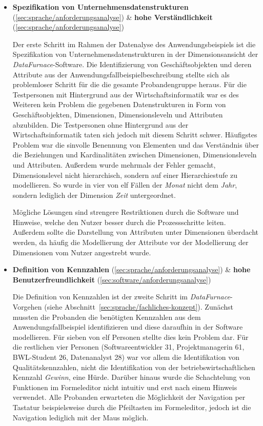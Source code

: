 \documentclass[
  language=german, %
  type=bachelor,%
  ngerman
]{isthesis}
\begin{document}
\begin{content}
\begin{itemize}
  \item \textbf{Spezifikation von Unternehmensdatenstrukturen} (\ref{sec:sprache/anforderungsanalyse}) \& \textbf{hohe Verständlichkeit} (\ref{sec:sprache/anforderungsanalyse})

    Der erste Schritt im Rahmen der Datenalyse des Anwendungsbeispiels ist
    die Spezifikation von Unternehmensdatenstrukturen in der Dimensionsansicht
    der \textit{DataFurnace}-Software. Die Identifizierung von
    Geschäftsobjekten und deren Attribute aus der
    Anwendungsfallbeispielbeschreibung stellte sich als problemloser Schritt
    für die die gesamte Probandengruppe heraus. Für die Testpersonen mit
    Hintergrund aus der Wirtschaftsinformatik war es des Weiteren kein Problem
    die gegebenen Datenstrukturen in Form von Geschäftsobjekten, Dimensionen,
    Dimensionsleveln und Attributen abzubilden. Die Testpersonen ohne
    Hintergrund aus der Wirtschaftsinformatik taten sich jedoch mit diesem
    Schritt schwer. Häufigstes Problem war die sinvolle Benennung von Elementen
    und das Verständnis über die Beziehungen und Kardinalitäten zwischen
    Dimensionen, Dimensionsleveln und Attributen. Außerdem wurde mehrmals der
    Fehler gemacht, Dimensionslevel nicht hierarchisch, sondern auf einer
    Hierarchiestufe zu modellieren. So wurde in vier von elf Fällen
    der \textit{Monat} nicht dem \textit{Jahr}, sondern lediglich der Dimension
    \textit{Zeit} untergeordnet. 
    
    Mögliche Lösungen sind strengere Restriktionen durch die
    Software und Hinweise, welche den Nutzer besser durch die Prozessschritte
    leiten. Außerdem sollte die Darstellung von Attributen unter Dimensionen
    überdacht werden, da häufig die Modellierung der Attribute vor der
    Modellierung der Dimensionen vom Nutzer angestrebt wurde.

  \item \textbf{Definition von Kennzahlen} (\ref{sec:sprache/anforderungsanalyse}) \& \textbf{hohe Benutzerfreundlichkeit} (\ref{sec:software/anforderungsanalyse})

    Die Definition von Kennzahlen ist der zweite Schritt im
    \textit{DataFurnace}-Vorgehen (siehe
    Abschnitt~\ref{sec:sprache/fachliches-konzept}). Zunächst mussten die
    Probanden die benötigten Kennzahlen aus dem Anwendungsfallbeispiel
    identifizieren und diese daraufhin in der Software modellieren. Für sieben
    von elf Personen stellte dies kein Problem dar.  Für die restlichen vier
    Personen (Softwareentwickler 31, Projektmanagerin 61, BWL-Student 26,
    Datenanalyst 28) war vor allem die Identifikation von Qualitätskennzahlen, nicht
    die Identifikation von der betriebswirtschaftlichen Kennzahl
    \textit{Gewinn}, eine Hürde. Darüber hinaus wurde die Schachtelung von
    Funktionen im Formeleditor nicht intuitiv und erst nach einem Hinweis
    verwendet. Alle Probanden erwarteten die Möglichkeit der
    Navigation per Tastatur beispielsweise durch die Pfeiltasten im
    Formeleditor, jedoch ist die Navigation lediglich mit der Maus möglich.


\end{itemize}
\end{content}
\end{document}

